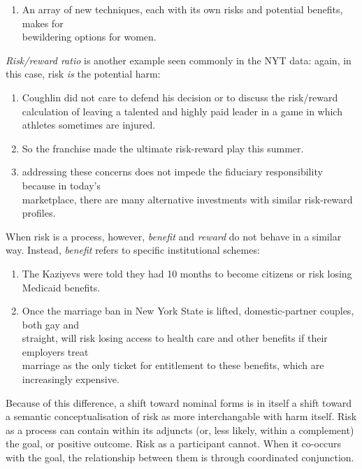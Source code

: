 \begin{enumerate} [before=\color{black}\ttfamily] \setlength\itemsep{0em} \small\item An array of new techniques, each with its own risks and potential benefits, makes for \\ bewildering options for women.
\end{enumerate}
%
\emph{Risk\slash reward ratio} is another example seen commonly in the NYT data: again, in this case, risk \emph{is} the potential harm:
%
\begin{enumerate} [before=\color{black}\ttfamily] \setlength\itemsep{0em} \small\item Coughlin did not care to defend his decision or to discuss the  risk\slash reward calculation of leaving a talented and highly paid leader in a game in which athletes sometimes are injured.\item So the franchise made the ultimate risk-reward play this summer.\item addressing these concerns does not impede the fiduciary responsibility because in today's \\ marketplace, there are many alternative investments with similar risk-reward profiles.
\end{enumerate}
%
When risk is a process, however, \emph{benefit} and \emph{reward} do not behave in a similar way. Instead, \emph{benefit} refers to specific institutional schemes:
%
\begin{enumerate} [before=\color{black}\ttfamily] \setlength\itemsep{0em} \small\item The Kaziyevs were told they had 10 months to become citizens or risk losing Medicaid benefits.\item Once the marriage ban in New York State is lifted, domestic-partner couples, both gay and \\ straight, will risk losing access to health care and other benefits if their employers treat \\ marriage as the only ticket for entitlement to these benefits, which are increasingly expensive.
\end{enumerate}
%
Because of this difference, a shift toward nominal forms is in itself a shift toward a semantic conceptualisation of risk as more interchangable with harm itself. Risk as a process can contain within its adjuncts (or, less likely, within a complement) the goal, or positive outcome. Risk as a participant cannot. When it co-occurs with the goal, the relationship between them is through coordinated conjunction.

